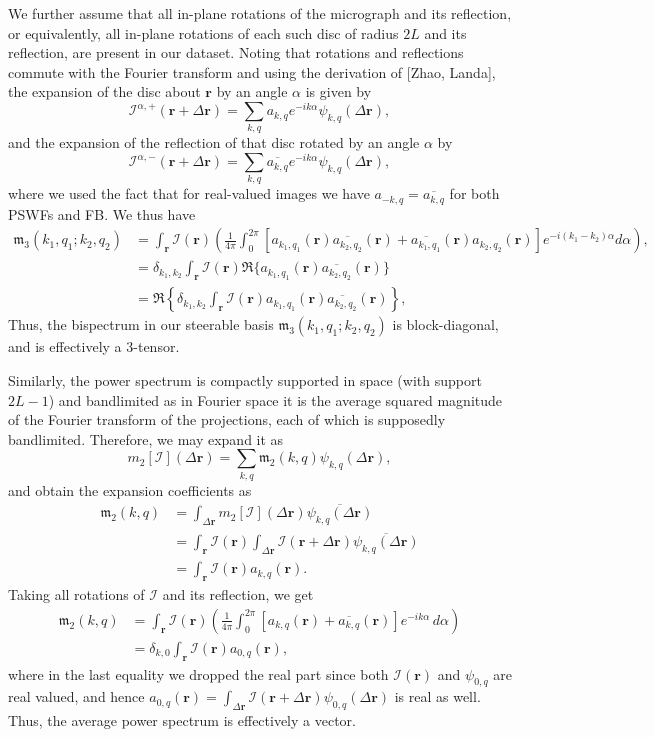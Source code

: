 \documentclass[english,11pt]{article}
\newcommand{\1}{\mathbf{1}}
\newcommand{\rr}{\textbf{r}}
\newcommand{\II}{\mathcal{I}}
\numberwithin{equation}{section}
\theoremstyle{plain}
\theoremstyle{definition}
\theoremstyle{remark}
\theoremstyle{plain}
\theoremstyle{remark}
\theoremstyle{plain}
\theoremstyle{plain}
\begin{document}
We further assume that all in-plane rotations of the micrograph and its reflection, or equivalently, all in-plane rotations of each such disc of radius $2L$ and its reflection, are present in our dataset. Noting that rotations and reflections commute with the Fourier transform and using the derivation of [Zhao, Landa], the expansion of the disc about $\rr$ by an angle $\alpha$ is given by
\[ \II^{\alpha,+}(\rr+\Delta\rr) = \sum_{k,q}a_{k,q}e^{-ik\alpha}\psi_{k,q}(\Delta\rr),\]
and the expansion of the reflection of that disc rotated by an angle $\alpha$ by
\[ \II^{\alpha,-}(\rr+\Delta\rr) = \sum_{k,q}\overline{a_{k,q}}e^{-ik\alpha}\psi_{k,q}(\Delta\rr),\]
where we used the fact that for real-valued images we have $a_{-k,q}=\overline{a_{k,q}}$ for both PSWFs and FB. We thus have
\[\begin{aligned} \mathfrak{m}_3(k_1,q_1;k_2,q_2) &= \int_{\rr}\II(\rr)\left(\frac{1}{4\pi}\int_0^{2\pi}\left[a_{k_1,q_1}(\rr)\overline{a_{k_2,q_2}}(\rr) + \overline{a_{k_1,q_1}}(\rr)a_{k_2,q_2}(\rr)\right]e^{-i(k_1-k_2)\alpha}d\alpha\right),\\
&= \delta_{k_1,k_2}\int_{\rr}\II(\rr)\Re\{a_{k_1,q_1}(\rr)\overline{a_{k_2,q_2}}(\rr)\}\\
&= \Re\left\{\delta_{k_1,k_2}\int_{\rr}\II(\rr)a_{k_1,q_1}(\rr)\overline{a_{k_2,q_2}}(\rr)\right\},\end{aligned}\]
Thus, the bispectrum in our steerable basis $\mathfrak{m}_3(k_1,q_1;k_2,q_2)$ is block-diagonal, and is effectively a 3-tensor. 

Similarly, the power spectrum is compactly supported in space (with
support $2L-1$) and bandlimited as in Fourier space it is the average
squared magnitude of the Fourier transform of the projections, each
of which is supposedly bandlimited. Therefore, we may expand it as
\[ m_2[\II](\Delta\rr) =
\sum_{k,q}\mathfrak{m}_2(k,q)\psi_{k,q}(\Delta\rr),\]
and obtain the expansion coefficients as
\[\begin{aligned} 
\mathfrak{m}_2(k,q) &=
\int_{\Delta\rr}m_2[\II](\Delta\rr)\overline{\psi_{k,q}(\Delta\rr)}\\
&=
\int_{\rr}\II(\rr)\int_{\Delta\rr}\II(\rr+\Delta\rr)\overline{\psi_{k,q}(\Delta\rr)}\\
&= \int_{\rr}\II(\rr)a_{k,q}(\rr). \end{aligned}\]
Taking all rotations of $\II$ and its reflection, we get
\[\begin{aligned} 
\mathfrak{m}_2(k,q) &= \int_{\rr}\II(\rr)\left(\frac{1}{4\pi}\int_0^{2\pi}[a_{k,q}(\rr) +
\overline{a_{k,q}}(\rr)]e^{-ik\alpha}\, d\alpha\right)\\ 
&= \delta_{k,0} \int_{\rr}\II(\rr)a_{0,q}(\rr), \end{aligned}\]
where in the last equality we dropped the real part since both
$\II(\rr)$ and $\psi_{0,q}$ are real valued, and hence $a_{0,q}(\rr)=\int_{\Delta\rr}\II(\rr+\Delta\rr)\psi_{0,q}(\Delta\rr)$
is real as well.
Thus, the average power spectrum is effectively a vector.
\end{document}
